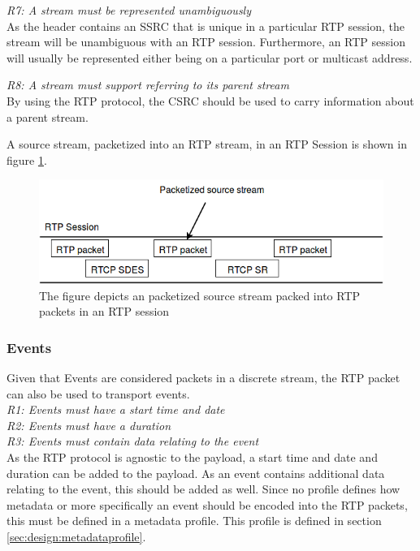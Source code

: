 \noindent\textit{R7: A stream must be represented unambiguously} \\
As the header contains an SSRC that is unique in a particular RTP session, the stream will be unambiguous with an RTP session. Furthermore, an RTP session will usually be represented either being on a particular port or multicast address.


\noindent\textit{R8: A stream must support referring to its parent stream} \\
By using the RTP protocol, the CSRC should be used to carry information about a parent stream.

A source stream, packetized into an RTP stream, in an RTP Session is shown in figure \ref{fig:design:stream}.

\begin{figure}[H]
	\centering
	\includegraphics[width=\textwidth]{figures/sourcestream-in-rtp}
	\caption{The figure depicts an packetized source stream packed into RTP packets in an RTP session}
	\label{fig:design:stream}
\end{figure}


\subsubsection{Events}
Given that Events are considered packets in a discrete stream, the RTP packet can also be used to transport events.\\

\noindent \textit{R1: Events must have a start time and date}\\
\textit{R2: Events must have a duration}\\
\textit{R3: Events must contain data relating to the event} \\

\noindent As the RTP protocol is agnostic to the payload, a start time and date and duration can be added to the payload. As an event contains additional data relating to the event, this should be added as well. Since no profile defines how metadata or more specifically an event should be encoded into the RTP packets, this must be defined in a metadata profile. This profile is defined in section \ref{sec:design:metadataprofile}.


